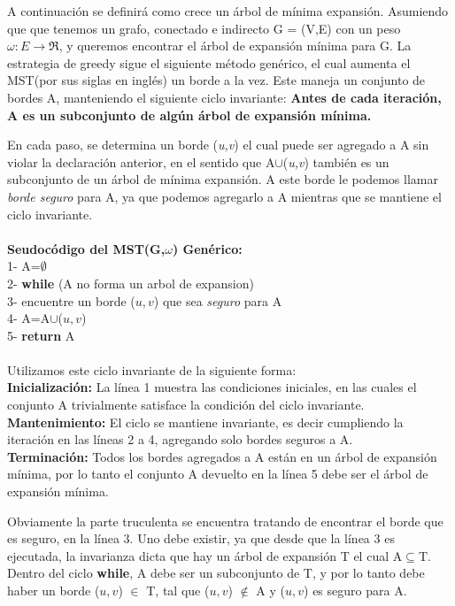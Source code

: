 \documentclass[a4paper, 11pt]{report}
\begin{document}
A continuación se definirá como crece un árbol de mínima expansión. Asumiendo que que tenemos un grafo, conectado e indirecto G = (V,E) con un peso $\omega: E \longrightarrow  \Re$, y queremos encontrar el árbol de expansión mínima para G. La estrategia de greedy sigue el siguiente método genérico, el cual aumenta el MST(por sus siglas en inglés) un borde a la vez. Este maneja un conjunto de bordes A, manteniendo el siguiente ciclo invariante: \textbf{Antes de cada iteración, A es un subconjunto de algún árbol de expansión mínima.}

En cada paso, se determina un borde (\textit{u,v}) el cual puede ser agregado a A sin violar la declaración anterior, en el sentido que A$\cup${(\textit{u,v})} también es un subconjunto de un árbol de mínima expansión. A este borde le podemos llamar \textit{borde seguro} para A, ya que podemos agregarlo a A mientras que se mantiene el ciclo invariante.\\ \\
\textbf{Seudocódigo del MST(G,$ \omega$) Genérico: }\\
1- A=$ \emptyset$\\
2- \textbf{while} (A no forma un arbol de expansion)\\
3- 	\indent	encuentre un borde ($u,v$) que sea \textit{seguro} para A\\ 4- 	\indent	A=A$\cup${($u,v$)}\\
5- \textbf{return} A\\
\\
Utilizamos este ciclo invariante de la siguiente forma:
\\
\textbf{Inicialización:} La línea 1 muestra las condiciones iniciales, en las cuales el conjunto A trivialmente satisface la condición del ciclo invariante.  \\
\textbf{Mantenimiento:} El ciclo se mantiene invariante, es decir cumpliendo la iteración en las líneas 2 a 4, agregando solo bordes seguros a A.\\
\textbf{Terminación:} Todos los bordes agregados a A están en un árbol de expansión mínima, por lo tanto el conjunto A devuelto en la línea 5 debe ser el árbol de expansión mínima.

Obviamente la parte truculenta se encuentra tratando de encontrar el borde que es seguro, en la línea 3. Uno debe existir, ya que desde que la línea 3 es ejecutada, la invarianza dicta que hay un árbol de expansión T el cual A$ \subseteq $T. Dentro del ciclo \textbf{while}, A debe ser un subconjunto de T, y por lo tanto debe haber un borde ($u,v$) $ \in $ T, tal que ($u, v$) $\notin$ A y ($u, v$) es seguro para A.
\end{document}
